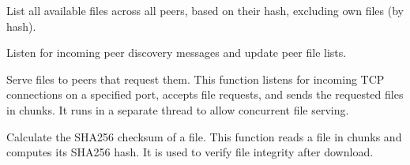 \documentclass[letterpaper,10pt,english]{sphinxmanual}
\begin{document}

\begin{fulllineitems}
\label{\detokenize{main:main.list_files}}
\pysigstartsignatures
\pysiglinewithargsret
{}
{}
{}
\pysigstopsignatures
\sphinxAtStartPar
List all available files across all peers, based on their hash, excluding own files (by hash).

\end{fulllineitems}


\begin{fulllineitems}
\label{\detokenize{main:main.listen_for_peers}}
\pysigstartsignatures
\pysiglinewithargsret
{}
{}
{}
\pysigstopsignatures
\sphinxAtStartPar
Listen for incoming peer discovery messages and update peer file lists.

\end{fulllineitems}


\begin{fulllineitems}
\label{\detokenize{main:main.serve_files}}
\pysigstartsignatures
\pysiglinewithargsret
{}
{}
{}
\pysigstopsignatures
\sphinxAtStartPar
Serve files to peers that request them.
This function listens for incoming TCP connections on a specified port,
accepts file requests, and sends the requested files in chunks.
It runs in a separate thread to allow concurrent file serving.

\end{fulllineitems}


\begin{fulllineitems}
\label{\detokenize{main:main.sha256sum}}
\pysigstartsignatures
\pysiglinewithargsret
{}
{}
{}
\pysigstopsignatures
\sphinxAtStartPar
Calculate the SHA\sphinxhyphen{}256 checksum of a file.
This function reads a file in chunks and computes its SHA\sphinxhyphen{}256 hash.
It is used to verify file integrity after download.

\end{fulllineitems}
\end{document}
